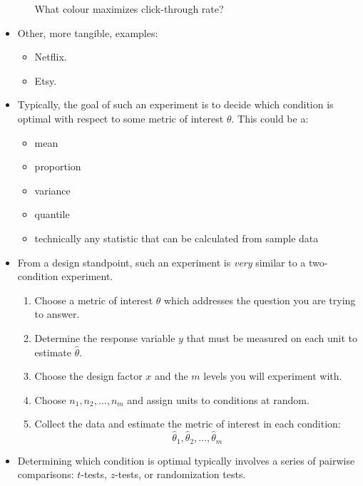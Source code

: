 \begin{itemize}
\begin{itemize}
                        What colour maximizes click-through rate?
            \end{itemize}
      \item Other, more tangible, examples:
            \begin{itemize}
                  \item Netflix.
                  \item Etsy.
            \end{itemize}
      \item Typically, the goal of such an experiment is to decide which condition is
            optimal with respect to some metric of interest $ \theta $. This could be a:
            \begin{itemize}
                  \item mean
                  \item proportion
                  \item variance
                  \item quantile
                  \item technically any statistic that can be calculated from sample data
            \end{itemize}
      \item From a design standpoint, such an experiment is \emph{very} similar to
            a two-condition experiment.
            \begin{enumerate}
                  \item Choose a metric of interest $ \theta $ which addresses the question
                        you are trying to answer.
                  \item Determine the response variable $ y $ that must be measured on each
                        unit to estimate $ \hat{\theta} $.
                  \item Choose the design factor $ x $ and the $ m $ levels you will experiment with.
                  \item Choose $ n_1,n_2,\ldots,n_m $ and assign units to conditions at random.
                  \item Collect the data and estimate the metric of interest in each condition:
                        \[ \hat{\theta}_1,\hat{\theta}_2,\ldots,\hat{\theta}_m \]
            \end{enumerate}
      \item Determining which condition is optimal typically involves a series of pairwise
            comparisons: $ t $-tests, $ z $-tests, or randomization tests.

\end{itemize}
